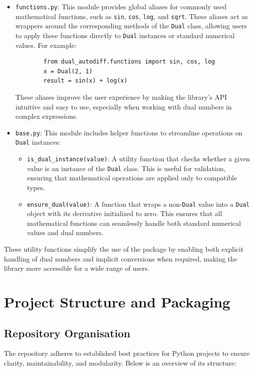 \documentclass[a4paper,12pt]{article}
\begin{document}
    \begin{itemize}
        \item \texttt{functions.py}: This module provides global aliases for commonly used mathematical functions, such as \texttt{sin}, \texttt{cos}, \texttt{log}, and \texttt{sqrt}. These aliases act as wrappers around the corresponding methods of the \texttt{Dual} class, allowing users to apply these functions directly to \texttt{Dual} instances or standard numerical values. For example:
        \begin{verbatim}
        from dual_autodiff.functions import sin, cos, log
        x = Dual(2, 1)
        result = sin(x) + log(x)
        \end{verbatim}
        These aliases improve the user experience by making the library's API intuitive and easy to use, especially when working with dual numbers in complex expressions.
    
        \item \texttt{base.py}: This module includes helper functions to streamline operations on \texttt{Dual} instances:
        \begin{itemize}
            \item \texttt{is\_dual\_instance(value)}: A utility function that checks whether a given value is an instance of the \texttt{Dual} class. This is useful for validation, ensuring that mathematical operations are applied only to compatible types.
            \item \texttt{ensure\_dual(value)}: A function that wraps a non-\texttt{Dual} value into a \texttt{Dual} object with its derivative initialized to zero. This ensures that all mathematical functions can seamlessly handle both standard numerical values and dual numbers.
        \end{itemize}
    \end{itemize}
    
    These utility functions simplify the use of the package by enabling both explicit handling of dual numbers and implicit conversions when required, making the library more accessible for a wide range of users.
    

\section{Project Structure and Packaging}

\subsection{Repository Organisation}
The repository adheres to established best practices for Python projects to ensure clarity, maintainability, and modularity. Below is an overview of its structure:
\end{document}
